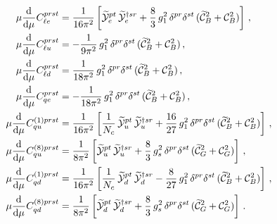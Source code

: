 \begin{align}
\mu \dv[]{}{\mu}{C}_{\ell e}^{prst} &= \frac{1}{16\pi^2}\left[\widetilde{\mathcal{Y}}_e^{pt}\,\widetilde{\mathcal{Y}}_e^{\dagger sr} + \frac{8}{3}\,g_1^2\,\delta^{pr}\delta^{st} \,(\widetilde{\mathcal{C}}_{B}^2 + \mathcal{C}_{B}^2)\right] \, ,
\\
\mu \dv[]{}{\mu}{C}_{\ell u}^{prst} &= -\frac{1}{9\pi^2}\,g_1^2 \,\delta^{pr}\delta^{st}\, (\widetilde{\mathcal{C}}_{B}^2 + \mathcal{C}_{B}^2) \, ,
\\
\mu \dv[]{}{\mu}{C}_{\ell d}^{prst} &= \frac{1}{18\pi^2}\,g_1^2 \,\delta^{pr}\delta^{st}\, (\widetilde{\mathcal{C}}_{B}^2 + \mathcal{C}_{B}^2) \, ,
\\
\mu \dv[]{}{\mu}{C}_{qe}^{prst} &= -\frac{1}{18\pi^2}\,g_1^2\,\delta^{pr}\delta^{st} \, (\widetilde{\mathcal{C}}_{B}^2 + \mathcal{C}_{B}^2) \, ,
\\
\mu \dv[]{}{\mu}{C}_{qu}^{(1)prst} &=\frac{1}{16\pi^2}\left[\frac{1}{N_c}\,\widetilde{\mathcal{Y}}_u^{pt}\,\widetilde{\mathcal{Y}}_u^{\dagger sr} + \frac{16}{27}\,g_1^2\,\delta^{pr}\delta^{st} \,(\widetilde{\mathcal{C}}_{B}^2 + \mathcal{C}_{B}^2)\right] \, ,
\\
\mu \dv[]{}{\mu}{C}_{qu}^{(8)prst} &=\frac{1}{8\pi^2}\left[\widetilde{\mathcal{Y}}_u^{pt}\,\widetilde{\mathcal{Y}}_u^{\dagger sr} + \frac{8}{3}\,g_s^2\,\delta^{pr}\delta^{st} \,(\widetilde{\mathcal{C}}_{G}^2 + \mathcal{C}_{G}^2)\right] \, ,
\\
\mu \dv[]{}{\mu}{C}_{qd}^{(1)prst} &=\frac{1}{16\pi^2}\left[\frac{1}{N_c}\,\widetilde{\mathcal{Y}}_d^{pt}\,\widetilde{\mathcal{Y}}_d^{\dagger sr} - \frac{8}{27}\,g_1^2\,\delta^{pr}\delta^{st} \,(\widetilde{\mathcal{C}}_{B}^2 + \mathcal{C}_{B}^2)\right] \, ,
\\
\mu \dv[]{}{\mu}{C}_{qd}^{(8)prst} &=\frac{1}{8\pi^2}\left[\widetilde{\mathcal{Y}}_d^{pt}\,\widetilde{\mathcal{Y}}_d^{\dagger sr} + \frac{8}{3}\,g_s^2\,\delta^{pr}\delta^{st} \,(\widetilde{\mathcal{C}}_{G}^2 + \mathcal{C}_{G}^2)\right] \, .
\end{align}

